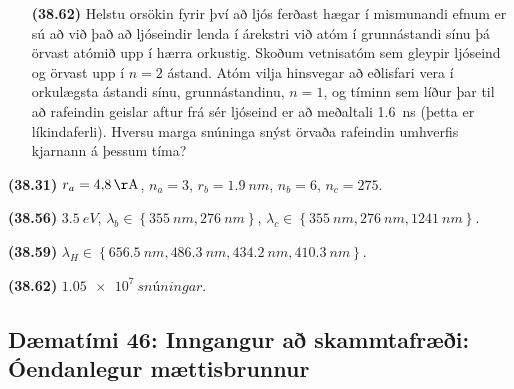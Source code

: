 \ifdefined \wholebook \else\documentclass[oneside]{book}\usepackage{EdlBook}\graphicspath{{figures/}}
\begin{document}
\begin{enumerate}[label = \textbf{(\alph*)}]
\item[\textbf{(38.62)}] Helstu orsökin fyrir því að ljós ferðast hægar í mismunandi efnum er sú að við það að ljóseindir lenda í árekstri við atóm í grunnástandi sínu þá örvast atómið upp í hærra orkustig. Skoðum vetnisatóm sem gleypir ljóseind og örvast upp í $n=2$ ástand. Atóm vilja hinsvegar að eðlisfari vera í orkulægsta ástandi sínu, grunnástandinu, $n=1$, og tíminn sem líður þar til að rafeindin geislar aftur frá sér ljóseind er að meðaltali \SI{1.6}{ns} (þetta er líkindaferli). Hversu marga snúninga snýst örvaða rafeindin umhverfis kjarnann á þessum tíma?

\end{enumerate}

\begin{tcolorbox}
\begin{enumerate*}[label = ]
  \item \textbf{(38.31)} $r_a = \SI{4.8}{\AA}$, $n_a = 3$, $r_b = \SI{1.9}{nm}$, $n_b = 6$, $n_c = 275$.
  \item \textbf{(38.56)} $\SI{3.5}{eV}$, $\lambda_b \in \left\{ \SI{355}{nm}, \SI{276}{nm}  \right\}$, $\lambda_c \in \left\{ \SI{355}{nm}, \SI{276}{nm}, \SI{1241}{nm}  \right\}$.
  \item \textbf{(38.59)} $\lambda_H \in \left\{ \SI{656.5}{nm}, \SI{486.3}{nm}, \SI{434.2}{nm}, \SI{410,3}{nm} \right\}$. \\
  \item \textbf{(38.62)} $\SI{1.05e7}{snúningar}$.
\end{enumerate*}
\end{tcolorbox}

\newpage

\subsection*{Dæmatími 46: Inngangur að skammtafræði: Óendanlegur mættisbrunnur}
\end{document}
